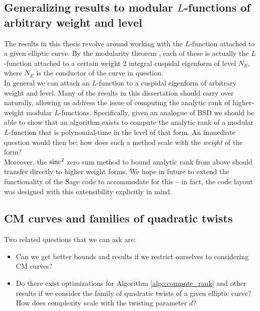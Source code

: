 \subsection{Generalizing results to modular $L$-functions of arbitrary weight and level}

The results in this thesis revolve around working with the $L$-function attached to a given elliptic curve. By the modularity theorem \cite{BCDT-2011}, each of these is actually the $L$-function attached to a certain weight 2 integral cuspidal eigenform of level $N_E$, where $N_E$ is the conductor of the curve in question. \\

In general we can attach an $L$-function to a cuspidal eigenform of arbitrary weight and level. Many of the results in this dissertation should carry over naturally, allowing us address the issue of computing the analytic rank of higher-weight modular $L$-functions. Specifically, given an analogue of BSD we should be able to show that an algorithm exists to compute the analytic rank of a modular $L$-function that is polynomial-time in the level of that form. An immediate question would then be: how does such a method scale with the {\it weight} of the form? \\

Moreover, the $\operatorname{sinc}^2$ zero sum method to bound analytic rank from above should transfer directly to higher weight forms. We hope in future to extend the functionality of the Sage code to accommodate for this -- in fact, the code layout was designed with this extensibility explicitly in mind.

\subsection{CM curves and families of quadratic twists}

Two related questions that we can ask are:
\begin{itemize}
\item Can we get better bounds and results if we restrict ourselves to considering CM curves?
\item Do there exist optimizations for Algorithm \ref{algo:compute_rank} and other results if we consider the family of quadratic twists of a given elliptic curve? How does complexity scale with the twisting parameter $d$?
\end{itemize}

